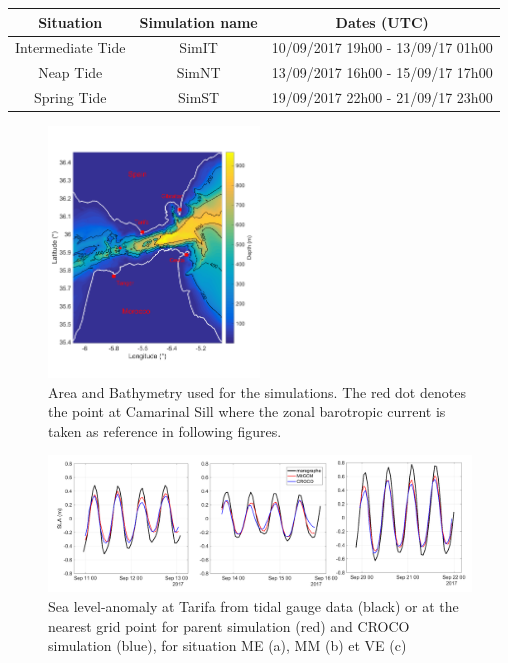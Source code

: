 \begin{table}[h]
        \centering
        \begin{tabular}{|c|c|c|}
                \hline
                Situation & Simulation name & Dates (UTC)\\
                \hline
                Intermediate Tide & SimIT & 10/09/2017 19h00 - 13/09/17 01h00  \\
                Neap Tide& SimNT & 13/09/2017 16h00 - 15/09/17 17h00 \\
                Spring Tide& SimST & 19/09/2017 22h00 - 21/09/17 23h00  \\
                \hline
        \end{tabular}
        \label{tab_dates_MIV}
\end{table}

\begin{figure}[!h]
        \includegraphics[width=0.5\textwidth]{./GBR3D/FigBathyVHR.png}
        \caption{Area and Bathymetry used for the simulations. The red dot denotes the point at Camarinal Sill where the zonal barotropic current is taken as reference in following figures.}
        \label{FigBathy3D}
\end{figure}



\begin{figure}[!h]
        \includegraphics[width=\textwidth]{./GBR3D/SLA_Tarifa_ME2VE2IES.png}
        \caption{Sea level-anomaly at Tarifa from tidal gauge data (black) or at the nearest grid point for parent simulation (red) and CROCO simulation (blue), for situation ME (a), MM (b) et VE (c)}
        \label{fig_maree_tar}
\end{figure}

